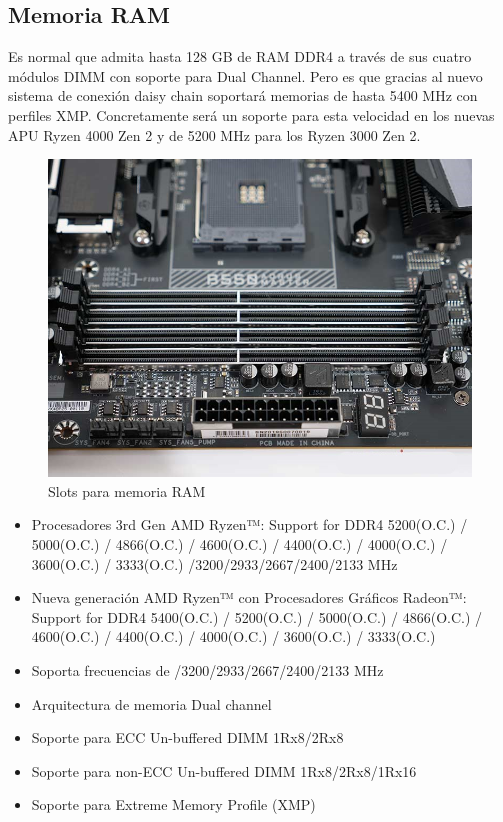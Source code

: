 \documentclass{article}
\begin{document}
  \newpage
    \subsection{Memoria RAM}
      Es normal que admita hasta 128 GB de RAM DDR4 a través de sus cuatro módulos DIMM con soporte para Dual Channel. Pero es que gracias al nuevo sistema de conexión daisy chain soportará memorias de hasta 5400 MHz con perfiles XMP. 
      Concretamente será un soporte para esta velocidad en los nuevas APU Ryzen 4000 Zen 2 y de 5200 MHz para los Ryzen 3000 Zen 2.
      \begin{figure}[h]
        \centering
        \includegraphics[scale = 0.5]{img/slots.jpg}
        \caption{Slots para memoria RAM}
      \end{figure}     
      \begin{itemize}
        \item Procesadores 3rd Gen AMD Ryzen™: Support for DDR4 5200(O.C.) / 5000(O.C.) / 4866(O.C.) / 4600(O.C.) / 4400(O.C.) / 4000(O.C.) / 3600(O.C.) / 3333(O.C.) /3200/2933/2667/2400/2133 MHz 
        \item Nueva generación AMD Ryzen™ con Procesadores Gráficos Radeon™: Support for DDR4 5400(O.C.) / 5200(O.C.) / 5000(O.C.) / 4866(O.C.) / 4600(O.C.) / 4400(O.C.) / 4000(O.C.) / 3600(O.C.) / 3333(O.C.)
        \item Soporta frecuencias de /3200/2933/2667/2400/2133 MHz 
        \item Arquitectura de memoria Dual channel 
        \item Soporte para ECC Un-buffered DIMM 1Rx8/2Rx8 
        \item Soporte para non-ECC Un-buffered DIMM 1Rx8/2Rx8/1Rx16 
        \item Soporte para Extreme Memory Profile (XMP)
      \end{itemize}
  \newpage
\end{document}
